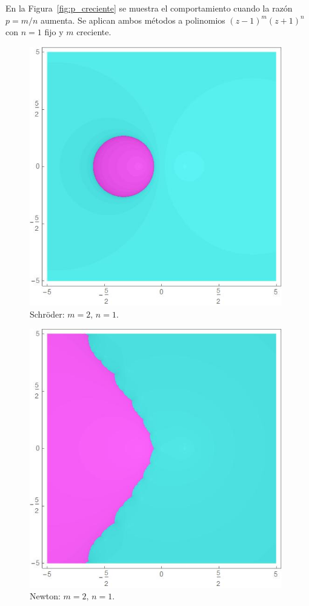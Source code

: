 En la Figura~\ref{fig:p_creciente} se muestra el comportamiento cuando la razón $p=m/n$ aumenta. Se aplican ambos métodos a polinomios $(z-1)^m(z+1)^n$ con $n=1$ fijo y $m$ creciente.

\begin{figure}[H]
\centering 
\begin{minipage}[t]{0.45\textwidth}
\centering
\includegraphics[width=0.98\textwidth]{fuentes/articulo-cuadraticos/imagenes/sch_m_2n_1.jpg}
\small Schröder: $m=2, \, n=1.$
\end{minipage}\hfill
\begin{minipage}[t]{0.45\textwidth}
\centering
\includegraphics[width=0.98\textwidth]{fuentes/articulo-cuadraticos/imagenes/newton_m_2n_1.jpg}
\small Newton: $m=2, \, n=1.$
\end{minipage}


\end{figure}
